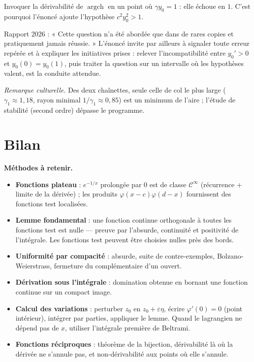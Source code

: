 \documentclass[11pt,a4paper]{article}
\providecommand{\tightlist}{\setlength{\itemsep}{0pt}\setlength{\parskip}{0pt}}
\begin{document}
\begin{piege}

Invoquer la dérivabilité de \(\operatorname{argch}\) en un point où \(\gamma y_0=1\) : elle échoue en \(1\). C'est pourquoi l'énoncé ajoute l'hypothèse \(c^2y_0^2>1\).

\end{piege}

\begin{jury}

Rapport 2026 : « Cette question n'a été abordée que dans de rares copies et pratiquement jamais réussie. » L'énoncé invite par ailleurs à signaler toute erreur repérée et à expliquer les initiatives prises : relever l'incompatibilité entre \(y_0'>0\) et \(y_0(0)=y_0(1)\), puis traiter la question sur un intervalle où les hypothèses valent, est la conduite attendue.

\end{jury}

\emph{Remarque culturelle.} Des deux chaînettes, seule celle de col le plus large (\(\gamma_1\approx1{,}18\), rayon minimal \(1/\gamma_1\approx0{,}85\)) est un minimum de l'aire ; l'étude de stabilité (second ordre) dépasse le programme.

\hypertarget{bilan}{%
\section{Bilan}\label{bilan}}

\textbf{Méthodes à retenir.}

\begin{itemize}
\tightlist
\item
  \textbf{Fonctions plateau} : \(e^{-1/x}\) prolongée par \(0\) est de classe \(\mathcal C^\infty\) (récurrence + limite de la dérivée) ; les produits \(\varphi(x-c)\varphi(d-x)\) fournissent des fonctions test localisées.
\item
  \textbf{Lemme fondamental} : une fonction continue orthogonale à toutes les fonctions test est nulle --- preuve par l'absurde, continuité et positivité de l'intégrale. Les fonctions test peuvent être choisies nulles près des bords.
\item
  \textbf{Uniformité par compacité} : absurde, suite de contre-exemples, Bolzano-Weierstrass, fermeture du complémentaire d'un ouvert.
\item
  \textbf{Dérivation sous l'intégrale} : domination obtenue en bornant une fonction continue sur un compact image.
\item
  \textbf{Calcul des variations} : perturber \(z_0\) en \(z_0+\varepsilon\eta\), écrire \(\varphi'(0)=0\) (point intérieur), intégrer par parties, appliquer le lemme. Quand le lagrangien ne dépend pas de \(x\), utiliser l'intégrale première de Beltrami.
\item
  \textbf{Fonctions réciproques} : théorème de la bijection, dérivabilité là où la dérivée ne s'annule pas, et non-dérivabilité aux points où elle s'annule.
\end{itemize}
\end{document}
